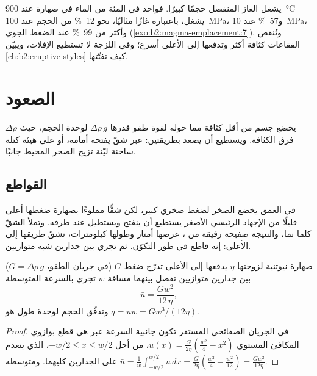 يشغل الغاز المنفصل حجمًا كبيرًا. فواحد في المئة من الماء في صهارة عند
\qty{900}{\celsius} يشغل، باعتباره غازًا مثاليًا، نحو \qty{12}{\percent} من
الحجم عند \qty{100}{MPa}، و\qty{57}{\percent} عند \qty{10}{MPa}، وأكثر من
\qty{99}{\percent} عند الضغط الجوي (\cref{exo:b2:magma-emplacement:7}). وتُنقص الفقاعات
كثافة  أكثر وتدفعها إلى الأعلى أسرع؛ وفي  اللزجة
لا تستطيع الإفلات، ويبيّن \cref{ch:b2:eruptive-styles} كيف تفتّتها.

\section{الصعود}

يخضع جسم من  أقل كثافة مما حوله لقوة طفو قدرها
$\Delta\rho\,g$ لوحدة الحجم، حيث $\Delta\rho$ فرق الكثافة. ويستطيع أن
يصعد بطريقتين: عبر شقّ يفتحه أمامه، أو على هيئة كتلة ساخنة
ليّنة تزيح الصخر المحيط جانبًا.

\subsection{القواطع}

في العمق يخضع الصخر لضغط صخري كبير، لكن شقًّا مملوءًا
بصهارة ضغطها أعلى قليلًا من الإجهاد الرئيسي الأصغر يستطيع أن
ينفتح ويستطيل عند طرفه. وتملأ  الشقّ كلما نما، والنتيجة
صفيحة رقيقة من ، عرضها أمتار وطولها كيلومترات، تشقّ طريقها
إلى الأعلى: إنه قاطع في طور التكوّن. ثم تجري  بين جدارين شبه
متوازيين.

\begin{proposition}\label{prop:b2:magma-emplacement:poiseuille}
صهارة نيوتنية لزوجتها $\eta$ يدفعها إلى الأعلى تدرّج ضغط $G$
(في جريان الطفو، $G = \Delta\rho\,g$) بين جدارين متوازيين تفصل بينهما مسافة $w$
تجري بالسرعة المتوسطة
\[
\bar u = \frac{G w^2}{12\,\eta},
\]
وتدفّق الحجم لوحدة طول  هو $q = \bar u w = G w^3/(12\eta)$.
\end{proposition}

\begin{proof}
في الجريان الصفائحي المستقر تكون جانبية السرعة عبر  هي قطع بوازوي
المكافئ المستوي $u(x) = \frac{G}{2\eta}\left(\frac{w^2}{4} - x^2\right)$، من أجل
$-w/2 \le x \le w/2$، الذي ينعدم على الجدارين كليهما. ومتوسطه
$\bar u = \frac1w\int_{-w/2}^{w/2}u\,dx = \frac{G}{2\eta}\left(\frac{w^2}{4} -
\frac{w^2}{12}\right) = \frac{Gw^2}{12\eta}$.
\end{proof}

